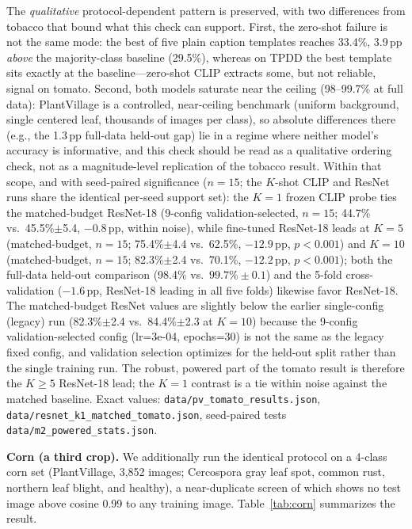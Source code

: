 \documentclass[10pt,a4paper]{article}
\begin{document}
The \emph{qualitative} protocol-dependent pattern is preserved, with two differences from tobacco that bound what this check can support. First, the zero-shot failure is not the same mode: the best of five plain caption templates reaches 33.4\%, 3.9\,pp \emph{above} the majority-class baseline (29.5\%), whereas on TPDD the best template sits exactly at the baseline---zero-shot CLIP extracts some, but not reliable, signal on tomato. Second, both models saturate near the ceiling (98--99.7\% at full data): PlantVillage is a controlled, near-ceiling benchmark (uniform background, single centered leaf, thousands of images per class), so absolute differences there (e.g., the 1.3\,pp full-data held-out gap) lie in a regime where neither model's accuracy is informative, and this check should be read as a qualitative ordering check, not as a magnitude-level replication of the tobacco result. Within that scope, and with seed-paired significance ($n{=}15$; the $K$-shot CLIP and ResNet runs share the identical per-seed support set): the $K{=}1$ frozen CLIP probe ties the matched-budget ResNet-18 (9-config validation-selected, $n{=}15$; 44.7\% vs.\ 45.5\%$\pm$5.4, $-0.8$\,pp, within noise), while fine-tuned ResNet-18 leads at $K{=}5$ (matched-budget, $n{=}15$; 75.4\%$\pm$4.4 vs.\ 62.5\%, $-12.9$\,pp, $p{<}0.001$) and $K{=}10$ (matched-budget, $n{=}15$; 82.3\%$\pm$2.4 vs.\ 70.1\%, $-12.2$\,pp, $p{<}0.001$); both the full-data held-out comparison (98.4\% vs.\ $99.7\%\pm0.1$) and the 5-fold cross-validation ($-1.6$\,pp, ResNet-18 leading in all five folds) likewise favor ResNet-18. The matched-budget ResNet values are slightly below the earlier single-config (legacy) run (82.3\%$\pm$2.4 vs.\ 84.4\%$\pm$2.3 at $K{=}10$) because the 9-config validation-selected config (lr=3e-04, epochs=30) is not the same as the legacy fixed config, and validation selection optimizes for the held-out split rather than the single training run. The robust, powered part of the tomato result is therefore the $K{\geq}5$ ResNet-18 lead; the $K{=}1$ contrast is a tie within noise against the matched baseline. Exact values: \texttt{data/pv\_tomato\_results.json}, \texttt{data/resnet\_k1\_matched\_tomato.json}, seed-paired tests \texttt{data/m2\_powered\_stats.json}.

\textbf{Corn (a third crop).} We additionally run the identical protocol on a 4-class corn set (PlantVillage, 3{,}852 images; Cercospora gray leaf spot, common rust, northern leaf blight, and healthy), a near-duplicate screen of which shows no test image above cosine 0.99 to any training image. Table~\ref{tab:corn} summarizes the result.
\end{document}
